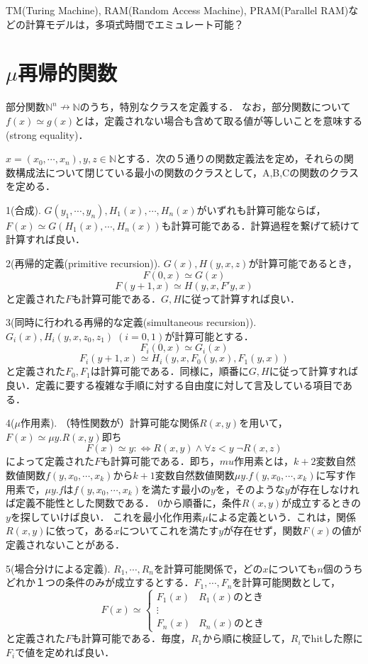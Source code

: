 \documentclass[uplatex, dvipdfmx]{jsreport}
\begin{document}
TM(Turing Machine), RAM(Random Access Machine), PRAM(Parallel RAM)などの計算モデルは，多項式時間でエミュレート可能？

\section{$\mu$再帰的関数}
部分関数$\mathbb{N}^n\nrightarrow\mathbb{N}$のうち，特別なクラスを定義する．
なお，部分関数について$f(x)\simeq g(x)$とは，定義されない場合も含めて取る値が等しいことを意味する(strong equality)．

\begin{definition}\label{def-primitive_recursive_function}
    $x=(x_0,\cdots,x_n), y,z\in\mathbb{N}$とする．次の５通りの関数定義法を定め，それらの関数構成法について閉じている最小の関数のクラスとして，A,B,Cの関数のクラスを定める．

    1(合成). $G(y_1,\cdots,y_n), H_1(x), \cdots, H_n(x)$がいずれも計算可能ならば，$F(x)\simeq G(H_1(x),\cdots,H_n(x))$も計算可能である．計算過程を繋げて続けて計算すれば良い．

    2(再帰的定義(primitive recursion)). $G(x),H(y,x,z)$が計算可能であるとき，
    \[ F(0,x)\simeq G(x) \]
    \[ F(y+1,x)\simeq H(y,x,F'y,x) \]
    と定義された$F$も計算可能である．$G,H$に従って計算すれば良い．

    3(同時に行われる再帰的な定義(simultaneous recursion)). $G_i(x),H_i(y,x,z_0,z_1)\;(i=0,1)$が計算可能とする．
    \[ F_i(0,x)\simeq G_i(x) \]
    \[ F_i(y+1,x)\simeq H_i(y,x,F_0(y,x),F_1(y,x)) \]
    と定義された$F_0,F_1$は計算可能である．同様に，順番に$G,H$に従って計算すれば良い．定義に要する複雑な手順に対する自由度に対して言及している項目である．

    4($\mu$作用素). （特性関数が）計算可能な関係$R(x,y)$を用いて，$F(x)\simeq \mu y.R(x,y)$即ち
    \[ F(x)\simeq y:\Leftrightarrow R(x,y)\land\forall z<y\; \lnot R(x,z) \]
    によって定義された$F$も計算可能である．即ち，$mu$作用素とは，$k+2$変数自然数値関数$f(y,x_0,\cdots,x_k)$から$k+1$変数自然数値関数$\mu y.f(y,x_0,\cdots,x_k)$に写す作用素で，$\mu y.f$は$f(y,x_0,\cdots,x_k)$を満たす最小の$y$を，そのような$y$が存在しなければ定義不能性とした関数である．
    $0$から順番に，条件$R(x,y)$が成立するときの$y$を探していけば良い．
    これを最小化作用素$\mu$による定義という．これは，関係$R(x,y)$に依って，ある$x$についてこれを満たす$y$が存在せず，関数$F(x)$の値が定義されないことがある．

    5(場合分けによる定義). $R_1,\cdots,R_n$を計算可能関係で，どの$x$についても$n$個のうちどれか１つの条件のみが成立するとする．$F_1,\cdots,F_n$を計算可能関数として，
    \[ F(x)\simeq\begin{cases}
        F_1(x) & R_1(x)のとき \\
        \vdots & \\
        F_n(x) & R_n(x)のとき
    \end{cases} \]
    と定義された$F$も計算可能である．毎度，$R_1$から順に検証して，$R_i$でhitした際に$F_i$で値を定めれば良い．


\end{definition}
\end{document}

